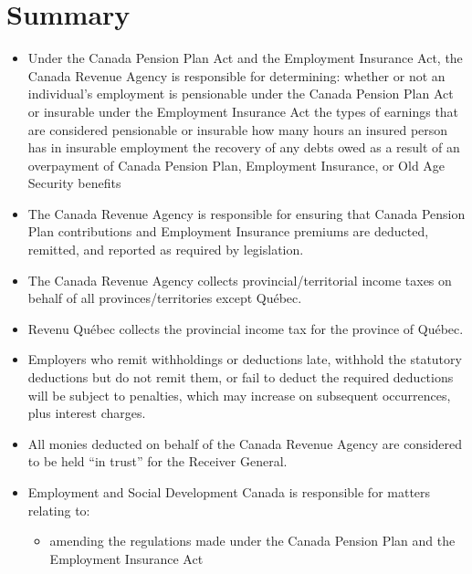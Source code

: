 \documentclass[letterpaper,10pt,english]{sphinxmanual}
\begin{document}
\section{Summary}
\label{\detokenize{2_compliance:summary}}\begin{itemize}
\item {} 
\sphinxAtStartPar
Under the Canada Pension Plan Act and the Employment Insurance Act, the Canada Revenue Agency is responsible for determining:
\sphinxhyphen{} whether or not an individual’s employment is pensionable under the Canada Pension Plan Act or insurable under the Employment Insurance Act
\sphinxhyphen{} the types of earnings that are considered pensionable or insurable
\sphinxhyphen{} how many hours an insured person has in insurable employment
\sphinxhyphen{} the recovery of any debts owed as a result of an overpayment of Canada Pension Plan, Employment Insurance, or Old Age Security benefits

\item {} 
\sphinxAtStartPar
The Canada Revenue Agency is responsible for ensuring that Canada Pension Plan contributions and Employment Insurance premiums are deducted, remitted, and reported as required by legislation.

\item {} 
\sphinxAtStartPar
The Canada Revenue Agency collects provincial/territorial income taxes on behalf of all provinces/territories except Québec.

\item {} 
\sphinxAtStartPar
Revenu Québec collects the provincial income tax for the province of Québec.

\item {} 
\sphinxAtStartPar
Employers who remit withholdings or deductions late, withhold the statutory deductions but do not remit them, or fail to deduct the required deductions will be subject to penalties, which may increase on subsequent occurrences, plus interest charges.

\item {} 
\sphinxAtStartPar
All monies deducted on behalf of the Canada Revenue Agency are considered to be held “in trust” for the Receiver General.

\item {} 
\sphinxAtStartPar
Employment and Social Development Canada is responsible for matters relating to:
\begin{itemize}
\item {} 
\sphinxAtStartPar
amending the regulations made under the Canada Pension Plan and the Employment Insurance Act


\end{itemize}
\end{itemize}
\end{document}
